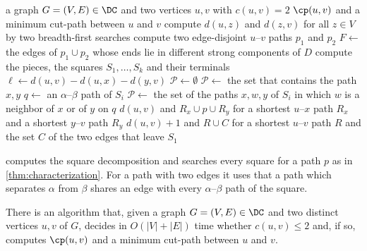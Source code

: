 \begin{algorithm}[tb]
\caption{A minimum cut-path for a pair with $c(u, v) = 2$ in a graph of $\DC$}
\label{alg:cut-two}
\begin{algorithmic}[1]
\Require a graph $G = (V, E) \in \DC$ and two vertices $u, v$ with $c(u, v) = 2$
\Ensure $\cp(u, v)$ and a minimum cut-path between $u$ and $v$
\State compute $d(u, z)$ and $d(z, v)$ for all $z \in V$ by two breadth-first searches \label{line:bfs}
\State compute two edge-disjoint $u$--$v$ paths $p_1$ and $p_2$ \label{line:paths}
\State $F \gets$ the edges of $p_1 \cup p_2$ whose ends lie in different strong components of $D$ \label{line:residual}
\State compute the pieces, the squares $S_1, \dots, S_k$ and their terminals \label{line:pieces}
 \label{line:loop}
        \State $\ell \gets d(u, v) - d(u, x) - d(y, v)$ \label{line:length}
        \State $\mathcal{P} \gets \emptyset$
            \State $\mathcal{P} \gets$ the set that contains the path $x, y$ \label{line:edge}
            \State $q \gets$ an $\alpha$--$\beta$ path of $S_i$ \label{line:q}
            \State $\mathcal{P} \gets$ the set of the paths $x, w, y$ of $S_i$ in which $w$ is a neighbor of $x$ or of $y$ on $q$ \label{line:candidates}
        \EndIf
             \label{line:test}
                \State \Return $d(u, v)$ and $R_x \cup p \cup R_y$ for a shortest $u$--$x$ path $R_x$ and a shortest $y$--$v$ path $R_y$ \label{line:found}
            \EndIf
        \EndFor
    \EndFor
\EndFor
\State \Return $d(u, v) + 1$ and $R \cup C$ for a shortest $u$--$v$ path $R$ and the set $C$ of the two edges that leave $S_1$ \label{line:not-found}
\end{algorithmic}
\end{algorithm}

 computes the square decomposition and searches every square for a path $p$ as in \cref{thm:characterization}.
For a path with two edges it uses that a path which separates $\alpha$ from $\beta$ shares an edge with every $\alpha$--$\beta$ path of the square.

\begin{theorem}
\label{thm:linear-time}
There is an algorithm that, given a graph $G = (V, E) \in \DC$ and two distinct vertices $u, v$ of $G$, decides in $O(|V| + |E|)$ time whether $c(u, v) \leq 2$ and, if so, computes $\cp(u, v)$ and a minimum cut-path between $u$ and $v$.
\end{theorem}

